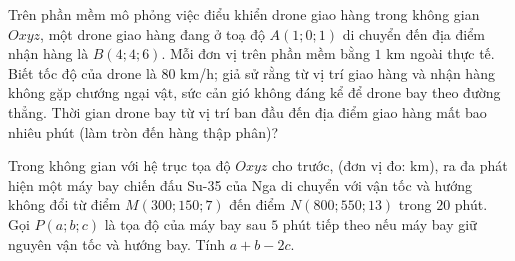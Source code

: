 \begin{ex}%
Trên phần mềm mô phỏng việc điểu khiển drone giao hàng trong không gian $O x y z$, một drone giao hàng đang ở toạ độ $A(1 ; 0 ; 1)$ di chuyển đến địa điểm nhận hàng là $B(4 ; 4 ; 6)$. Mỗi đơn vị trên phần mềm bằng $1$ km ngoài thực tế. Biết tốc độ của drone là $80$ km/h; giả sử rằng từ vị trí giao hàng và nhận hàng không gặp chướng ngại vật, sức cản gió không đáng kể để drone bay theo đường thẳng. Thời gian drone bay từ vị trí ban đầu đến địa điểm giao hàng mất bao nhiêu phút (làm tròn đến hàng thập phân)?
\end{ex}

\begin{ex}%
Trong không gian với hệ trục tọa độ $O x y z$ cho trước, (đơn vị đo: km), ra đa phát hiện một máy bay chiến đấu Su-35 của Nga di chuyển với vận tốc và hướng không đổi từ điểm $M(300 ; 150 ; 7)$ đến điểm $N(800 ; 550 ; 13)$ trong $20$ phút. Gọi $P(a;b;c)$ là tọa độ của máy bay sau $5$ phút tiếp theo nếu máy bay giữ nguyên vận tốc và hướng bay. Tính $a+b-2c$.
\end{ex}

